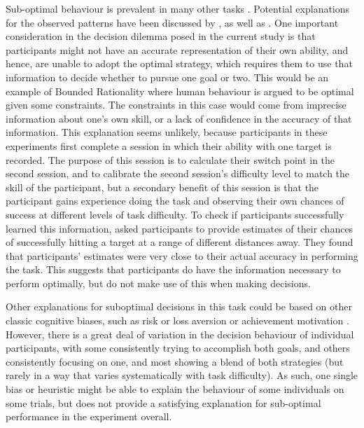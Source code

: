 \documentclass[vision,article,submit,moreauthors,pdftex,10pt,a4paper]{mdpi}
\begin{document}
Sub-optimal behaviour is prevalent in many other tasks \cite{rahnev2018suboptimality}. Potential explanations for the observed patterns have been discussed by \citeauthor{KahnemanChoicesValuseFrames} \cite{KahnemanChoicesValuseFrames}, as well as \citeauthor{Gigerenzer2011} \cite{Gigerenzer2011}. One important consideration in the decision dilemma posed in the current study is that participants might not have an accurate representation of their own ability, and hence, are unable to adopt the optimal strategy, which requires them to use that information to decide whether to pursue one goal or two. This would be an example of Bounded Rationality \cite{simon1990invariants} where human behaviour is argued to be optimal given some constraints. The constraints in this case would come from imprecise information about one’s own skill, or a lack of confidence in the accuracy of that information. This explanation seems unlikely, because participants in these experiments first complete a session in which their ability with one target is recorded. The purpose of this session is to calculate their switch point in the second session, and to calibrate the second session’s difficulty level to match the skill of the participant, but a secondary benefit of this session is that the participant gains experience doing the task and observing their own chances of success at different levels of task difficulty. To check if participants successfully learned this information, \citeauthor{james2017failure} \cite{james2017failure} asked participants to provide estimates of their chances of successfully hitting a target at a range of different distances away. They found that participants’ estimates were very close to their actual accuracy in performing the task. This suggests that participants do have the information necessary to perform optimally, but do not make use of this when making decisions. 

Other explanations for suboptimal decisions in this task could be based on other classic cognitive biases, such as risk or loss aversion \cite{KahnemanChoicesValuseFrames} or achievement motivation \cite{atkinson1960achievement}. However, there is a great deal of variation in the decision behaviour of individual participants, with some consistently trying to accomplish both goals, and others consistently focusing on one, and most showing a blend of both strategies (but rarely in a way that varies systematically with task difficulty). As such, one single bias or heuristic might be able to explain the behaviour of some individuals on some trials, but does not provide a satisfying explanation for sub-optimal performance in the experiment overall.
\end{document}
